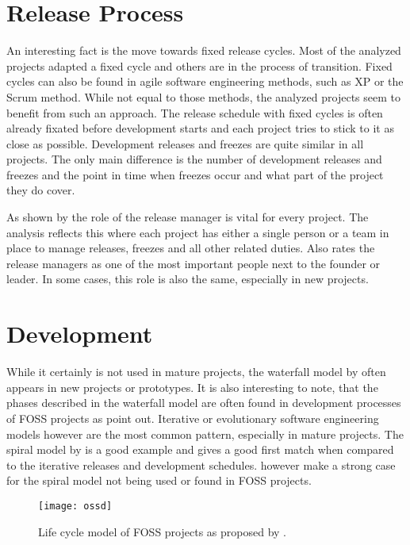 
\section{Release Process} %

An interesting fact is the move towards fixed release cycles. Most of the
analyzed projects adapted a fixed cycle and others are in the process of
transition. Fixed cycles can also be found in agile software engineering
methods, such as \acl{XP} or the Scrum method. While not equal to those
methods, the analyzed projects seem to benefit from such an approach. The
release schedule with fixed cycles is often already fixated before development
starts and each project tries to stick to it as close as possible. Development
releases and freezes are quite similar in all projects. The only main
difference is the number of development releases and freezes and the point in
time when freezes occur and what part of the project they do cover.

As shown by \textcite{Mockus2002} the role of the release manager is vital for
every project. The analysis reflects this where each project has either a
single person or a team in place to manage releases, freezes and all other
related duties. Also \textcite{Crowston2005} rates the release managers as one
of the most important people next to the founder or leader. In some cases, this
role is also the same, especially in new projects.


\section{Development} %

While it certainly is not used in mature projects, the waterfall model by
\textcite{Royce1970} often appears in new projects or prototypes. It is also
interesting to note, that the phases described in the waterfall model are often
found in development processes of \ac{FOSS} projects as \textcite{Roets2007}
point out. Iterative or evolutionary software engineering models however are
the most common pattern, especially in mature projects. The spiral model by
\textcite{Boehm1988} is a good example and gives a good first match when
compared to the iterative releases and development schedules.
\textcite{Roets2007} however make a strong case for the spiral model not being
used or found in \ac{FOSS} projects.

\begin{figure}[htbp]
  \centering
  \texttt{[image: ossd]}
  \caption[Life cycle model of \acl{FOSS} projects]
  {Life cycle model of \acl{FOSS} projects as proposed by \textcite{Roets2007}.}
\end{figure}

